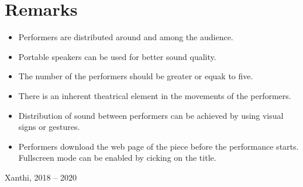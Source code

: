 \documentclass[11pt,letterpage]{book}
\begin{document}
\section*{Remarks}
\begin{itemize}
\item Performers are distributed around and among the audience.
\item Portable speakers can be used for better sound quality.
\item The number of the performers should be greater or equak to five.
\item There is an inherent theatrical element in the movements of the performers.
\item Distribution of sound between performers can be achieved by using visual signs  or gestures.
\item Performers download the web page of the piece before the performance starts. Fullscreen mode can be enabled by cicking on the title.
\end{itemize}
{\footnotesize\phantom{}\hfill Xanthi, 2018 -- 2020}
\end{document}
